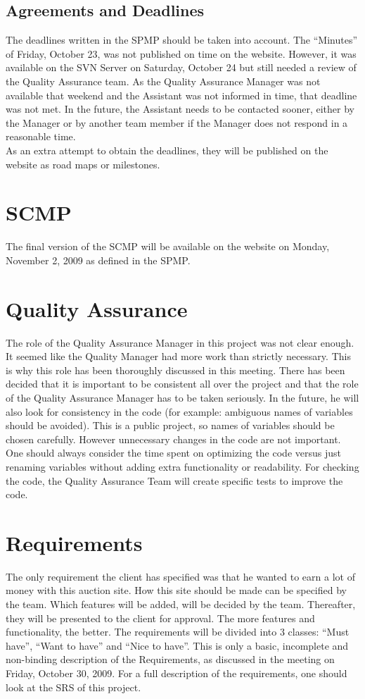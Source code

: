 \documentclass[a4paper, 12pt]{article}
\begin{document}
	\subsection{Agreements and Deadlines}
The deadlines written in the SPMP should be taken into account. The ``Minutes'' of Friday, October 23, was not published on time on the website. However, it was available on the SVN Server on Saturday, October 24 but still needed a review of the Quality Assurance team. As the Quality Assurance Manager was not available that weekend and the Assistant was not informed in time, that deadline was not met. In the future, the Assistant needs to be contacted sooner, either by the Manager or by another team member if the Manager does not respond in a reasonable time.\\
As an extra attempt to obtain the deadlines, they will be published on the website as road maps or milestones.
	\section{SCMP}
The final version of the SCMP will be available on the website on Monday, November 2, 2009 as defined in the SPMP.
	\section{Quality Assurance}
The role of the Quality Assurance Manager in this project was not clear enough. It seemed like the Quality Manager had more work than strictly necessary. This is why this role has been thoroughly discussed in this meeting. There has been decided that it is important to be consistent all over the project and that the role of the Quality Assurance Manager has to be taken seriously. In the future, he will also look for consistency in the code (for example: ambiguous names of variables should be avoided). This is a public project, so names of variables should be chosen carefully. However unnecessary changes in the code are not important. One should always consider the time spent on optimizing the code versus just renaming variables without adding extra functionality or readability. For checking the code, the Quality Assurance Team will create specific tests to improve the code.
	\section{Requirements}
The only requirement the client has specified was that he wanted to earn a lot of money with this auction site. How this site should be made can be specified by the team. Which features will be added, will be decided by the team. Thereafter, they will be presented to the client for approval. The more features and functionality, the better.
The requirements will be divided into 3 classes: ``Must have'', ``Want to have''  and ``Nice to have''. This is only a basic, incomplete and non-binding description of the Requirements, as discussed in the meeting on Friday, October 30, 2009. For a full description of the requirements, one should look at the SRS of this project.
\end{document}
